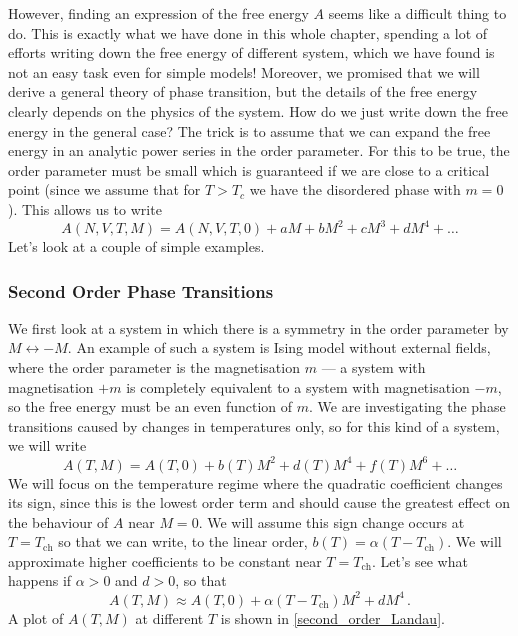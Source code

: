 \documentclass{article}
\theoremstyle{plain}\theoremheaderfont{\normalfont\bfseries}\theorembodyfont{\rmfamily}\theoremseparator{.}\newtheorem*{thm}{Theorem}\newtheorem*{law}{Law}\newtheorem*{pos}{Postulate}
\numberwithin{equation}{section}
\begin{document}
    However, finding an expression of the free energy \(A\) seems like a difficult thing to do. This is exactly what we have done in this whole chapter, spending a lot of efforts writing down the free energy of different system, which we have found is not an easy task even for simple models! Moreover, we promised that we will derive a general theory of phase transition, but the details of the free energy clearly depends on the physics of the system. How do we just write down the free energy in the general case? The trick is to assume that we can expand the free energy in an analytic power series in the order parameter. For this to be true, the order parameter must be small which is guaranteed if we are close to a critical point (since we assume that for \(T>T_c\) we have the disordered phase with \(m=0\)). This allows us to write
    \begin{equation}
        A(N,V,T,M)=A(N,V,T,0)+aM+bM^2+cM^3+dM^4+\dots
    \end{equation}
    Let's look at a couple of simple examples.
    \subsubsection{Second Order Phase Transitions}
    We first look at a system in which there is a symmetry in the order parameter by \(M\leftrightarrow -M\). An example of such a system is Ising model without external fields, where the order parameter is the magnetisation \(m\) --- a system with magnetisation \(+m\) is completely equivalent to a system with magnetisation \(-m\), so the free energy must be an even function of \(m\). We are investigating the phase transitions caused by changes in temperatures only, so for this kind of a system, we will write
    \begin{equation}
        A(T,M)=A(T,0)+b(T)M^2+d(T)M^4+f(T)M^6+\dots
    \end{equation}
    We will focus on the temperature regime where the quadratic coefficient changes its sign, since this is the lowest order term and should cause the greatest effect on the behaviour of \(A\) near \(M=0\). We will assume this sign change occurs at \(T=T_{\text{ch}}\) so that we can write, to the linear order, \(b(T)=\alpha(T-T_{\text{ch}})\). We will approximate higher coefficients to be constant near \(T=T_{\text{ch}}\). Let's see what happens if \(\alpha>0\) and \(d>0\), so that
    \begin{equation}
        A(T,M)\approx A(T,0)+\alpha(T-T_{\text{ch}})M^2+dM^4\,.
    \end{equation}
    A plot of \(A(T,M)\) at different \(T\) is shown in \cref{second_order_Landau}.
\end{document}

